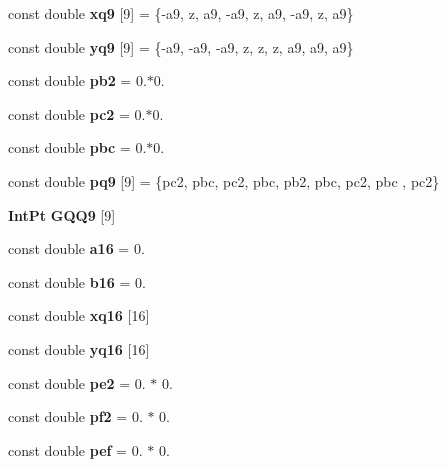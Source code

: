 \begin{DoxyCompactItemize}
\item 
const double {\bfseries xq9} [9] = \{-\/a9, z, a9, -\/a9, z, a9, -\/a9, z, a9\}\label{GaussQuadratureQuad_8cc_a4bcd1dfcf78a7f8595e578cb6504c1a3}

\item 
const double {\bfseries yq9} [9] = \{-\/a9, -\/a9, -\/a9, z, z, z, a9, a9, a9\}\label{GaussQuadratureQuad_8cc_a8cd82e2d26ad9fbc83b39cd66ba111fe}

\item 
const double {\bfseries pb2} = 0.$\ast$0.\label{GaussQuadratureQuad_8cc_a2914f6fd1ef11326e8a26fb758cf565d}

\item 
const double {\bfseries pc2} = 0.$\ast$0.\label{GaussQuadratureQuad_8cc_ad8be096e83ccb974f00f7af7b1d1298a}

\item 
const double {\bfseries pbc} = 0.$\ast$0.\label{GaussQuadratureQuad_8cc_a23456a4393a6992a164adfbeba63a1d7}

\item 
const double {\bfseries pq9} [9] = \{pc2, pbc, pc2, pbc, pb2, pbc, pc2, pbc , pc2\}\label{GaussQuadratureQuad_8cc_a7f424347deeecf558def8190808e2909}

\item 
{\bf Int\-Pt} {\bfseries G\-Q\-Q9} [9]
\item 
const double {\bfseries a16} = 0.\label{GaussQuadratureQuad_8cc_a7de2ac3d553e2d0ee4428119fc75edc0}

\item 
const double {\bfseries b16} = 0.\label{GaussQuadratureQuad_8cc_a2d76e6648f0d488f0e8309d6c82ee5d5}

\item 
const double {\bfseries xq16} [16]
\item 
const double {\bfseries yq16} [16]
\item 
const double {\bfseries pe2} = 0. $\ast$ 0.\label{GaussQuadratureQuad_8cc_aa3dbb2502b99aa05f996edb6ad687809}

\item 
const double {\bfseries pf2} = 0. $\ast$ 0.\label{GaussQuadratureQuad_8cc_aaf49b053a0c0ce5d5f42860c19daf312}

\item 
const double {\bfseries pef} = 0. $\ast$ 0.\label{GaussQuadratureQuad_8cc_a6e431065c336b4686ea46c7111e2aa32}


\end{DoxyCompactItemize}

